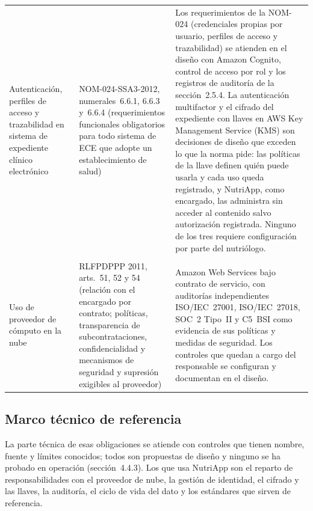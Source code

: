 \documentclass[12pt, a4paper]{article}
\begin{document}
\begin{longtable}{>{\raggedright\arraybackslash}p{2.8cm}
  >{\raggedright\arraybackslash}p{3.0cm}
  >{\raggedright\arraybackslash}p{8.5cm}}
  Autenticación, perfiles de acceso y trazabilidad en sistema de
  expediente clínico electrónico
    & NOM-024-SSA3-2012, numerales~6.6.1, 6.6.3 y~6.6.4 (requerimientos funcionales obligatorios
      para todo sistema de ECE que adopte un establecimiento
      de salud)
       & Los requerimientos de la NOM-024 (credenciales propias por
      usuario, perfiles de acceso y trazabilidad) se atienden en el
      diseño con Amazon Cognito, control de acceso por rol y los
      registros de auditoría de la sección~2.5.4. La autenticación
      multifactor y el cifrado del expediente con llaves en AWS Key
      Management Service (KMS) son decisiones de diseño que exceden
      lo que la norma pide: las políticas de la llave definen quién
      puede usarla y cada uso queda registrado, y NutriApp, como
      encargado, las administra sin acceder al contenido salvo
      autorización registrada. Ninguno de los tres requiere
      configuración por parte del nutriólogo. \\
  \\[4pt]

  Uso de proveedor de cómputo en la nube
    & RLFPDPPP 2011, arts.~51, 52 y 54 (relación con el encargado por
      contrato; políticas, transparencia de subcontrataciones,
      confidencialidad y mecanismos de seguridad y supresión
      exigibles al proveedor)
    & Amazon Web Services bajo contrato de servicio, con auditorías
      independientes ISO/IEC~27001, ISO/IEC~27018, SOC~2 Tipo~II y
      C5~BSI como evidencia de sus políticas y medidas de seguridad.
      Los controles que quedan a cargo del responsable se
      configuran y documentan en el diseño. \\

\end{longtable}
\subsection{Marco técnico de referencia}
 
La parte técnica de esas obligaciones se atiende con controles que
tienen nombre, fuente y límites conocidos; todos son propuestas de
diseño y ninguno se ha probado en operación (sección~4.4.3).
Los que usa NutriApp son el reparto de responsabilidades con el
proveedor de nube, la gestión de identidad, el cifrado y las
llaves, la auditoría, el ciclo de vida del dato y los estándares
que sirven de referencia.
 
\end{document}
